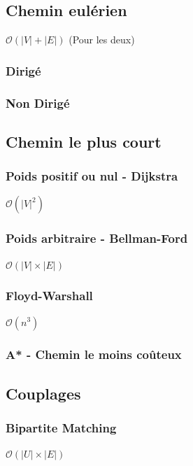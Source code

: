 \documentclass[8pt]{article}
\begin{document}
        \subsection{Chemin eulérien}
            $\mathcal{O}(\lvert V \rvert  + \lvert E \rvert)$ (Pour les deux)
            \subsubsection{Dirigé}
            {\scriptsize}
            \subsubsection{Non Dirigé}
            {\scriptsize}
        \subsection{Chemin le plus court}
            \subsubsection{Poids positif ou nul - Dijkstra}
            $\mathcal{O}(\lvert V \rvert^2)$
            {\scriptsize}
            \subsubsection{Poids arbitraire - Bellman-Ford}
            $\mathcal{O}(\lvert V \rvert  \times \lvert E \rvert)$
            {\scriptsize}
            \subsubsection{Floyd-Warshall}
            $\mathcal{O}(n^3)$
            {\scriptsize}
            \subsubsection{A* - Chemin le moins coûteux}
            {\scriptsize}
        \subsection{Couplages}
            \subsubsection{Bipartite Matching}
            $\mathcal{O}(\lvert U \rvert  \times \lvert E \rvert)$
            {\scriptsize}
\end{document}
